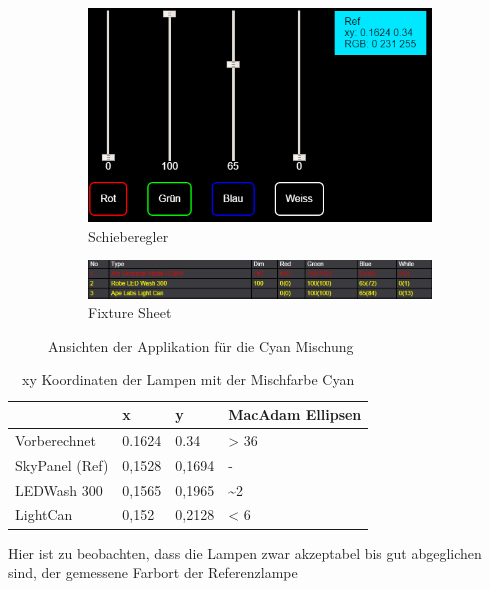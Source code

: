 \documentclass[11pt]{scrartcl}
\begin{document}
\begin{figure}[H]
    \centering
    \begin{subfigure}[b]{.39\textwidth}
        \includegraphics[width=\textwidth]{images/app_mix_cyan_faders.png}
        \caption{Schieberegler}
    \end{subfigure}
    \hfill 
    \begin{subfigure}[b]{.59\textwidth}
        \includegraphics[width=\textwidth]{images/app_mix_cyan_fixtureSheet.png}
        \caption{Fixture Sheet}
    \end{subfigure}
    \caption{Ansichten der Applikation für die Cyan Mischung}
\end{figure}
\noindent
\begin{table}[H]
    \begin{tabularx}{\textwidth}{|X|X|X|X|}
        \hline           & x        & y        & MacAdam Ellipsen\\\hline
        Vorberechnet     & 0.1624   & 0.34     & > 36\\\hline
        SkyPanel (Ref)   & 0,1528   & 0,1694   & -\\\hline
        LEDWash 300      & 0,1565   & 0,1965   & \textasciitilde 2\\\hline
        LightCan         & 0,152    & 0,2128   & < 6\\\hline
    \end{tabularx}
    \caption{xy Koordinaten der Lampen mit der Mischfarbe Cyan}
\end{table}
\noindent
Hier ist zu beobachten, dass die Lampen zwar akzeptabel bis gut abgeglichen sind, der gemessene Farbort der Referenzlampe
\end{document}
